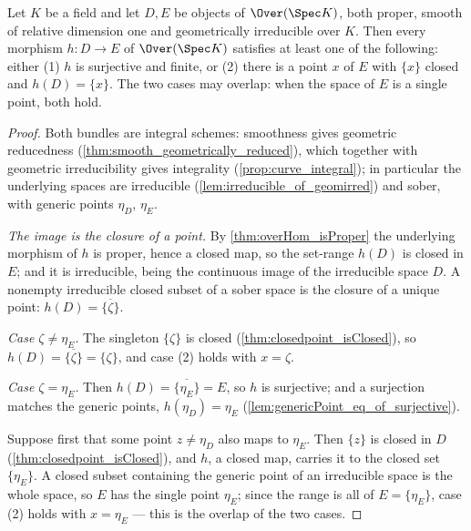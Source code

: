 \begin{theorem}
  \label{thm:curveHom_isFinite_or_constant}
  \leanok
  Let \(K\) be a field and let \(D, E\) be objects of \(\Over(\Spec K)\), both proper,
  smooth of relative dimension one and geometrically irreducible over \(K\). Then every
  morphism \(h : D \to E\) of \(\Over(\Spec K)\) satisfies at least one of the
  following: either (1) \(h\) is surjective and finite, or (2) there is a point \(x\)
  of \(E\) with \(\{x\}\) closed and \(h(D) = \{x\}\). The two cases may overlap: when
  the space of \(E\) is a single point, both hold.
\end{theorem}
\begin{proof}
  \leanok
  Both bundles are integral schemes: smoothness gives geometric reducedness
  (\ref{thm:smooth_geometrically_reduced}), which together with geometric
  irreducibility gives integrality (\ref{prop:curve_integral}); in particular the
  underlying spaces are irreducible (\ref{lem:irreducible_of_geomirred}) and sober,
  with generic points \(\eta_D\), \(\eta_E\).

  \emph{The image is the closure of a point.} By \ref{thm:overHom_isProper} the
  underlying morphism of \(h\) is proper, hence a closed map, so the set-range
  \(h(D)\) is closed in \(E\); and it is irreducible, being the continuous image of
  the irreducible space \(D\). A nonempty irreducible closed subset of a sober space is
  the closure of a unique point: \(h(D) = \overline{\{\zeta\}}\).

  \emph{Case \(\zeta \neq \eta_E\).} The singleton \(\{\zeta\}\) is closed
  (\ref{thm:closedpoint_isClosed}), so \(h(D) = \overline{\{\zeta\}} = \{\zeta\}\), and
  case (2) holds with \(x = \zeta\).

  \emph{Case \(\zeta = \eta_E\).} Then \(h(D) = \overline{\{\eta_E\}} = E\), so \(h\)
  is surjective; and a surjection matches the generic points, \(h(\eta_D) = \eta_E\)
  (\ref{lem:genericPoint_eq_of_surjective}).

  Suppose first that some point \(z \neq \eta_D\) also maps to \(\eta_E\). Then
  \(\{z\}\) is closed in \(D\) (\ref{thm:closedpoint_isClosed}), and \(h\), a closed
  map, carries it to the closed set \(\{\eta_E\}\). A closed subset containing the
  generic point of an irreducible space is the whole space, so \(E\) has the single
  point \(\eta_E\); since the range is all of \(E = \{\eta_E\}\), case (2) holds with
  \(x = \eta_E\) --- this is the overlap of the two cases.


\end{proof}
